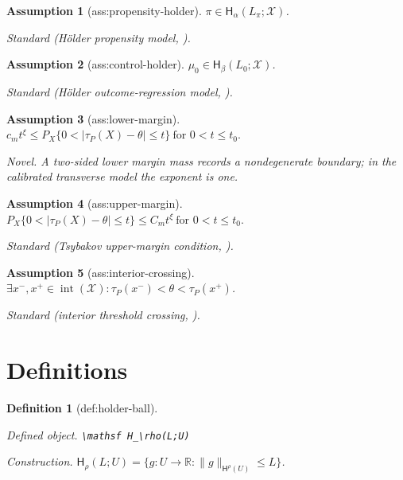 \documentclass{article}
\newtheorem{assumption}{Assumption}
\newtheorem{definition}{Definition}
\begin{document}
\begin{assumption}[ass:propensity-holder]\label{ass:propensity-holder}
\(\pi\in\mathsf H_\alpha(L_\pi;\mathcal X)\).
\par\smallskip\noindent\emph{Standard} (Hölder propensity model, \cite{KennedyBalakrishnanRobinsWasserman2024MinimaxCATE}).
\end{assumption}

\begin{assumption}[ass:control-holder]\label{ass:control-holder}
\(\mu_0\in\mathsf H_\beta(L_0;\mathcal X)\).
\par\smallskip\noindent\emph{Standard} (Hölder outcome-regression model, \cite{KennedyBalakrishnanRobinsWasserman2024MinimaxCATE}).
\end{assumption}

\begin{assumption}[ass:lower-margin]\label{ass:lower-margin}
\(c_m t^\xi\le P_X\{0<|\tau_P(X)-\theta|\le t\}\ \text{for }0<t\le t_0.\)
\par\smallskip\noindent\emph{Novel.} A two-sided lower margin mass records a nondegenerate boundary; in the calibrated transverse model the exponent is one.
\end{assumption}

\begin{assumption}[ass:upper-margin]\label{ass:upper-margin}
\(P_X\{0<|\tau_P(X)-\theta|\le t\}\le C_m t^\xi\ \text{for }0<t\le t_0.\)
\par\smallskip\noindent\emph{Standard} (Tsybakov upper-margin condition, \cite{AudibertTsybakov2007FastPlugin}).
\end{assumption}

\begin{assumption}[ass:interior-crossing]\label{ass:interior-crossing}
\(\exists x^-,x^+\in\operatorname{int}(\mathcal X):\tau_P(x^-)<\theta<\tau_P(x^+)\).
\par\smallskip\noindent\emph{Standard} (interior threshold crossing, \cite{AudibertTsybakov2007FastPlugin}).
\end{assumption}

\section{Definitions}

\begin{definition}[def:holder-ball]\label{def:holder-ball}
\par\smallskip\noindent\emph{Defined object.} \texttt{\textbackslash{}\allowbreak{}mathsf H\_\allowbreak{}\textbackslash{}\allowbreak{}rho(L;\allowbreak{}U)}
\par\smallskip\noindent\emph{Construction.} \(\mathsf H_\rho(L;U)=\{g:U\to\mathbb R:\|g\|_{\mathsf H^\rho(U)}\le L\}\).
\end{definition}
\end{document}
